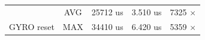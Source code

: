 \begin{table}[]
\begin{tabular}{@{}ccrrr@{}}
\multicolumn{1}{|c}{}                                & \cellcolor[HTML]{EFEFEF}AVG & \cellcolor[HTML]{EFEFEF}  25712 us & \cellcolor[HTML]{EFEFEF}    3.510 us & \multicolumn{1}{r|}{\cellcolor[HTML]{EFEFEF}   7325 $\times$}  \\
\multicolumn{1}{|c}{\multirow{-2}{*}{GYRO reset}}    & \cellcolor[HTML]{FFFFFF}MAX & \cellcolor[HTML]{FFFFFF}  34410 us & \cellcolor[HTML]{FFFFFF}    6.420 us & \multicolumn{1}{r|}{\cellcolor[HTML]{FFFFFF}   5359 $\times$}  \\ \midrule
\end{tabular}
\end{table}

